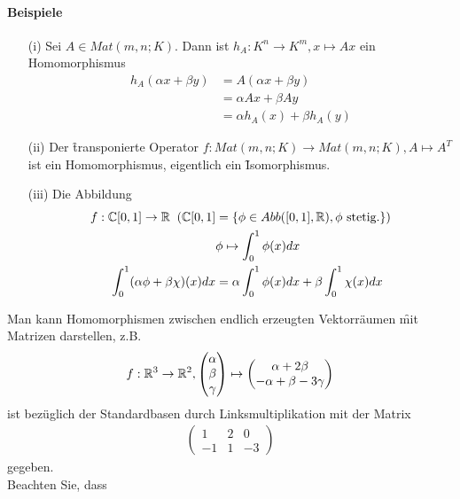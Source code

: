 \paragraph{Beispiele}
\begin{itemize}
\item[(i)] Sei $A \in Mat(m,n;K)$. Dann ist $h_A: K^n \rightarrow K^m, x \mapsto Ax$ ein Homomorphismus
\begin{align}
h_A(\alpha x + \beta y) &= A (\alpha x + \beta y) \\
&= \alpha Ax + \beta A y \\
&= \alpha h_A (x) + \beta h_A (y)
\end{align}
\item[(ii)] Der \f{transponierte Operator} $f: Mat(m,n;K) \rightarrow Mat(m,n;K), A \mapsto A^T$ ist ein Homomorphismus, eigentlich ein \f{Isomorphismus}.
\item[(iii)] Die Abbildung 
\begin{align}
f: \mathbb{C}[0,1] \rightarrow \mathbb{R}\;\; (\mathbb{C}[0,1] &= \{\phi \in Abb([0,1], \mathbb{R}), \phi \text{ stetig.}\})\\
&\phi \mapsto \int_{0}^{1} \phi(x) dx\\
\int_{0}^{1}(\alpha \phi + \beta \chi)(x) dx &= \alpha \int_{0}^{1} \phi(x) dx + \beta \int_{0}^{1} \chi(x) dx
\end{align}
\end{itemize}
Man kann Homomorphismen zwischen endlich erzeugten Vektorräumen \f{mit Matrizen darstellen}, z.B.
\begin{align}
f: \mathbb{R}^3 \rightarrow \mathbb{R}^2, \begin{pmatrix} \alpha \\ \beta \\ \gamma \end{pmatrix} \mapsto \begin{pmatrix} \alpha + 2 \beta \\ -\alpha + \beta - 3\gamma \end{pmatrix}
\end{align}
ist bezüglich der Standardbasen durch Linksmultiplikation mit der Matrix 
\begin{align}
\begin{pmatrix} 1 & 2 & 0 \\ -1 & 1 & -3 \end{pmatrix}
\end{align}
gegeben.\\
Beachten Sie, dass 
